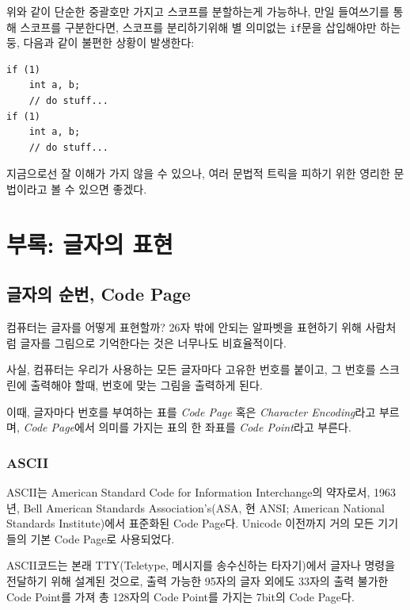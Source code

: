 \documentclass[a4paper,12pt]{book}
\newcommand{\V}[1]{\Verb|#1|}
\begin{document}
\begin{appendices}
위와 같이 단순한 중괄호만 가지고 스코프를 분할하는게 가능하나,
만일 들여쓰기를 통해 스코프를 구분한다면,
스코프를 분리하기위해 별 의미없는 \V{if}문을 삽입해야만 하는 둥,
다음과 같이 불편한 상황이 발생한다:

\begin{lstlisting}
if (1)
    int a, b;
    // do stuff...
if (1)
    int a, b;
    // do stuff...
\end{lstlisting}

지금으로선 잘 이해가 가지 않을 수 있으나,
여러 문법적 트릭을 피하기 위한 영리한 문법이라고 볼 수 있으면 좋겠다.


\chapter{부록: 글자의 표현}


\section{글자의 순번, Code Page}
\label{sec:unicode}

컴퓨터는 글자를 어떻게 표현할까?
26자 밖에 안되는 알파벳을 표현하기 위해 사람처럼 글자를 그림으로 기억한다는 것은 너무나도 비효율적이다.

사실, 컴퓨터는 우리가 사용하는 모든 글자마다 고유한 번호를 붙이고,
그 번호를 스크린에 출력해야 할때,
번호에 맞는 그림을 출력하게 된다.

이때, 글자마다 번호를 부여하는 표를 \textit{Code Page} 혹은 \textit{Character Encoding}라고 부르며,
\textit{Code Page}에서 의미를 가지는 표의 한 좌표를 \textit{Code Point}라고 부른다.

\subsection{ASCII}

ASCII는 American Standard Code for Information Interchange의 약자로서,
1963년, Bell American Standards Association's(ASA, 현 ANSI; American National Standards Institute)에서 표준화된 Code Page다.
Unicode 이전까지 거의 모든 기기들의 기본 Code Page로 사용되었다.

ASCII코드는 본래 TTY(Teletype, 메시지를 송수신하는 타자기)에서 글자나 명령을 전달하기 위해 설계된 것으로,
출력 가능한 95자의 글자 외에도 33자의 출력 불가한 Code Point를 가져 총 128자의 Code Point를 가지는 7bit의 Code Page다.


\end{appendices}
\end{document}
